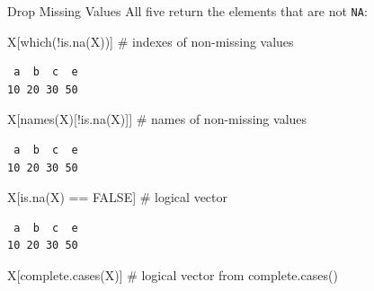 \documentclass[
  ignorenonframetext,
  aspectratio=169,
]{beamer}
\newenvironment{Shaded}{\begin{snugshade}}{\end{snugshade}}
\newcommand{\CommentTok}[1]{\textcolor[rgb]{0.37,0.37,0.37}{#1}}
\newcommand{\ConstantTok}[1]{\textcolor[rgb]{0.56,0.35,0.01}{#1}}
\newcommand{\FunctionTok}[1]{\textcolor[rgb]{0.28,0.35,0.67}{#1}}
\newcommand{\NormalTok}[1]{\textcolor[rgb]{0.00,0.23,0.31}{#1}}
\newcommand{\SpecialCharTok}[1]{\textcolor[rgb]{0.37,0.37,0.37}{#1}}
\begin{document}
\begin{frame}[fragile]{Drop Missing Values}
\protect\hypertarget{drop-missing-values}{}
All five return the elements that are not \texttt{NA}:

\begin{Shaded}
\begin{Highlighting}[]
\NormalTok{X[}\FunctionTok{which}\NormalTok{(}\SpecialCharTok{!}\FunctionTok{is.na}\NormalTok{(X))]          }\CommentTok{\# indexes of non{-}missing values}
\end{Highlighting}
\end{Shaded}

\begingroup\tiny\color{darkgray}

\begin{verbatim}
 a  b  c  e 
10 20 30 50 
\end{verbatim}

\endgroup

\begin{Shaded}
\begin{Highlighting}[]
\NormalTok{X[}\FunctionTok{names}\NormalTok{(X)[}\SpecialCharTok{!}\FunctionTok{is.na}\NormalTok{(X)]]       }\CommentTok{\# names of non{-}missing values}
\end{Highlighting}
\end{Shaded}

\begingroup\tiny\color{darkgray}

\begin{verbatim}
 a  b  c  e 
10 20 30 50 
\end{verbatim}

\endgroup

\begin{Shaded}
\begin{Highlighting}[]
\NormalTok{X[}\FunctionTok{is.na}\NormalTok{(X) }\SpecialCharTok{==} \ConstantTok{FALSE}\NormalTok{]         }\CommentTok{\# logical vector}
\end{Highlighting}
\end{Shaded}

\begingroup\tiny\color{darkgray}

\begin{verbatim}
 a  b  c  e 
10 20 30 50 
\end{verbatim}

\endgroup

\begin{Shaded}
\begin{Highlighting}[]
\NormalTok{X[}\FunctionTok{complete.cases}\NormalTok{(X)]         }\CommentTok{\# logical vector from complete.cases()}
\end{Highlighting}
\end{Shaded}


\end{frame}
\end{document}
